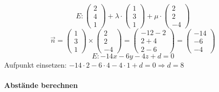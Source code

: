 \begin{example}
    $$E: \begin{pmatrix} 2 \\ 4 \\ 1 \end{pmatrix} + \lambda \cdot \begin{pmatrix} 1 \\ 3 \\ 1 \end{pmatrix} + \mu \cdot \begin{pmatrix} 2 \\ 2 \\ -4 \end{pmatrix}$$
    $$\vec{n} = \begin{pmatrix} 1 \\ 3 \\ 1 \end{pmatrix} \times \begin{pmatrix} 2 \\ 2 \\ -4 \end{pmatrix} = \begin{pmatrix} -12 -2 \\ 2 + 4 \\ 2 - 6 \end{pmatrix} = \begin{pmatrix} -14 \\ -6 \\ -4 \end{pmatrix}$$
    $$E: -14x - 6y - 4z + d = 0$$
    Aufpunkt einsetzen: $-14 \cdot 2 - 6 \cdot 4 - 4 \cdot 1 + d = 0 \Rightarrow d = 8$
\end{example}

\paragraph*{Abstände berechnen}


